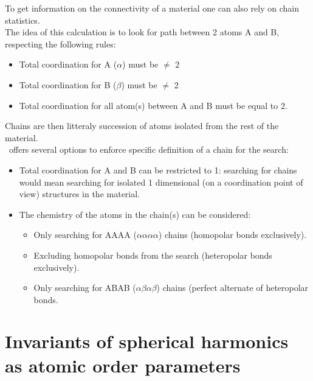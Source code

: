 To get information on the connectivity of a material one can also rely on chain statistics. \\
The idea of this calculation is to look for path between 2 atoms A and B, respecting the following rules:
\begin{itemize}
\item Total coordination for A ($\alpha$) must be $\ne$ 2
\item Total coordination for B ($\beta$) must be $\ne$ 2
\item Total coordination for all atom(s) between A and B must be equal to 2.
\end{itemize}
Chains are then litteraly succession of atoms isolated from the rest of the material. \\ 
\atomes\ offers several options to enforce specific definition of a chain for the search:
\begin{itemize}
\item Total coordination for A and B can be restricted to 1: searching for chains would mean searching for isolated 1 dimensional (on a coordination point of view) structures in the material. 
\item The chemistry of the atoms in the chain(s) can be considered:
\begin{itemize}
\item Only searching for AAAA ($\alpha\alpha\alpha\alpha$) chains (homopolar bonds exclusively).
\item Excluding homopolar bonds from the search (heteropolar bonds exclusively).
\item Only searching for ABAB ($\alpha\beta\alpha\beta$) chains (perfect alternate of heteropolar bonds. 
\end{itemize}
\end{itemize}
\section{Invariants of spherical harmonics as atomic order parameters}

